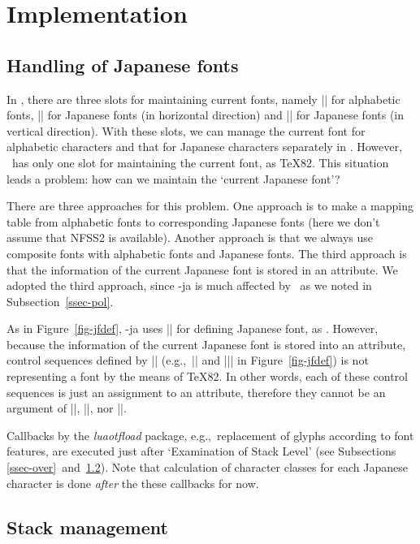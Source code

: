 \documentclass{ajt}
\begin{document}
\section{Implementation}
\label{sec:implementation}
\subsection{Handling of Japanese fonts}
In \pTeX, there are three slots for maintaining current fonts, namely
|\font| for alphabetic fonts, |\jfont| for Japanese fonts (in horizontal
direction) and |\tfont| for Japanese fonts (in vertical direction). With
these slots, we can manage the current font for alphabetic characters
and that for Japanese characters separately in \pTeX.  However, \LuaTeX\
has only one slot for maintaining the current font, as \TeX82.  This
situation leads a problem: how can we maintain the `current Japanese
font'?

There are three approaches for this problem. One approach is to make a
mapping table from alphabetic fonts to corresponding Japanese fonts
(here we don't assume that NFSS2 is available).  Another approach is
that we always use composite fonts with alphabetic fonts and Japanese
fonts. The third approach is that the information of the current
Japanese font is stored in an attribute. We adopted the third approach,
since \LuaTeX-ja is much affected by \pTeX\ as we noted in
Subsection~\ref{ssec-pol}.

As in Figure~\ref{fig-jfdef}, \LuaTeX-ja uses |\jfont| for defining
Japanese font, as \pTeX.  However, because the information of the current
Japanese font is stored into an attribute, control sequences defined by
|\jfont| (e.g.,~|\foo| and |\bar| in Figure~\ref{fig-jfdef}) is
not representing a font by the means of \TeX82. In other words, each of
these control sequences is just an assignment to an attribute, therefore
they cannot be an argument of |\the|, |\fontname|, nor |\textfont|.


Callbacks by the \emph{luaotfload} package, e.g.,~replacement of glyphs
according to font features, are executed just after `Examination of
Stack Level' (see Subsections \ref{ssec-over}~and~\ref{ssec-stack}). Note that calculation of
character classes for each Japanese character is done \emph{after} the
these callbacks for now. 

\subsection{Stack management}
\label{ssec-stack}
\end{document}
